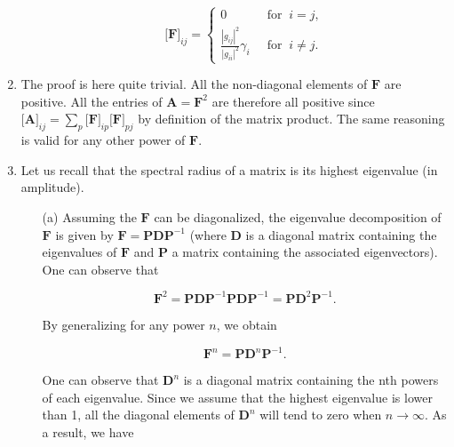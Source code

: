 \documentclass [a4paper, 11pt] {article}
\begin{document}
\begin{solution}
\begin{enumerate}
\begin{itemize}
        \begin{equation}
            \big[\mathbf{F}\big]_{ij} = \begin{cases}
             0 & \; \; \text{for} \; \; i=j, \\
             \frac{|g_{ij}|^2}{|g_{ii}|^2} \gamma_i & \; \; \text{for} \; \; i \neq j.
            \end{cases}
        \end{equation}
    \end{itemize}
    
    \item The proof is here quite trivial. All the non-diagonal elements of $\mathbf{F}$ are positive. All the entries of $\mathbf{A} = \mathbf{F}^2$ are therefore all positive since $\big[\mathbf{A}\big]_{ij} = \sum_p \big[\mathbf{F}\big]_{ip} \big[\mathbf{F}\big]_{pj}$ by definition of the matrix product. The same reasoning is valid for any other power of $\mathbf{F}$.
    \item Let us recall that the spectral radius of a matrix is its highest eigenvalue (in amplitude). 
    
    \begin{itemize}
        \item[(a)] Assuming the $\mathbf{F}$ can be diagonalized, the eigenvalue decomposition of $\mathbf{F}$ is given by $\mathbf{F} = \mathbf{P} \mathbf{D} \mathbf{P}^{-1}$ (where $\mathbf{D}$ is a diagonal matrix containing the eigenvalues of $\mathbf{F}$ and $\mathbf{P}$ a matrix containing the associated eigenvectors). One can observe that 
        
        \begin{equation} \mathbf{F}^2 = \mathbf{P}\mathbf{D}\mathbf{P}^{-1}\mathbf{P}\mathbf{D}\mathbf{P}^{-1} = \mathbf{P}\mathbf{D}^2\mathbf{P}^{-1}.
        \end{equation}
        
        By generalizing for any power $n$, we obtain
        
        \begin{equation} \mathbf{F}^n = \mathbf{P}\mathbf{D}^n\mathbf{P}^{-1}. \end{equation}
        
        One can observe that $\mathbf{D}^n$ is a diagonal matrix containing the nth powers of each eigenvalue. Since we assume that the highest eigenvalue is lower than 1, all the diagonal elements of $\mathbf{D}^n$ will tend to zero when $n \rightarrow \infty$. As a result, we have 
        

\end{itemize}
\end{enumerate}
\end{solution}
\end{document}
